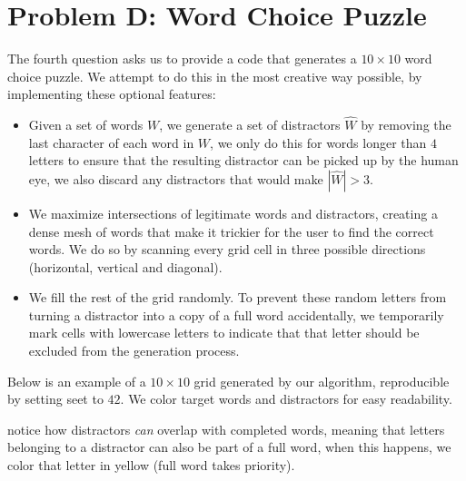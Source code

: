 \documentclass{solutionclass} %
\begin{document}
    \divider

    \section{Problem D: Word Choice Puzzle}
    \begin{solution}
        The fourth question asks us to provide a code that generates a $10\times 10$ word choice puzzle. We attempt 
        to do this in the most creative way possible, by implementing these optional features:

        \begin{itemize}
            \item Given a set of words $W$, we generate a set of distractors $\hat{W}$ by removing the last character of each word in $W$, we only do this for words longer than $4$ letters to ensure that the resulting distractor can be picked up by the human eye, we also discard any distractors that would make $|\hat{W}| > 3$.
            \item We maximize intersections of legitimate words and distractors, creating a dense mesh of words that make it trickier for the user to find the correct words. We do so by scanning every grid cell in three possible directions (horizontal, vertical and diagonal).
            \item We fill the rest of the grid randomly. To prevent these random letters from turning a distractor into a copy of a full word accidentally, we temporarily mark cells with lowercase letters to indicate that that letter should be excluded from the generation process.
        \end{itemize}

        {\renewcommand{\arraystretch}{1.15}%
        \newcommand{\wrd}[1]{\colorbox{yellow!60}{\strut\textbf{#1}}}%
        \newcommand{\di}[1]{\colorbox{red!65}{\strut\color{white}#1}}%

        Below is an example of a $10 \times 10$ grid generated by our algorithm, reproducible by setting seet to $42$. We color target words and distractors for easy readability.
        
        
        notice how distractors \emph{can} overlap with completed words, meaning that letters belonging to a distractor can also be part of a full word, when this happens, we color that letter in yellow (full word takes priority).

}
\end{solution}
\end{document}

